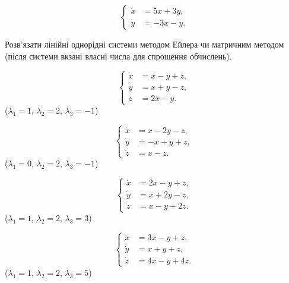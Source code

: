 \begin{multicols}{2}
    \begin{problem}
        \[ \left\{ \begin{aligned} 
            \dot x &= 5 x + 3 y, \\
            \dot y &= -3 x - y.
        \end{aligned} \right. \]
    \end{problem}
\end{multicols}

Розв'язати лінійні однорідні системи методом Ейлера чи матричним методом (після системи вкзані власні числа для спрощення обчислень).
\begin{multicols}{2}
    \begin{problem}
        \[ \left\{ \begin{aligned} 
            \dot x &= x - y + z, \\
            \dot y &= x + y - z, \\
            \dot z &= 2 x - y.
        \end{aligned} \right. \]
        ($\lambda_1 = 1$, $\lambda_2 = 2$, $\lambda_3 = -1$)
    \end{problem}
    
    \begin{problem}
        \[ \left\{ \begin{aligned} 
            \dot x &= x - 2 y - z, \\
            \dot y &= -x + y + z, \\
            \dot z &= x - z.
        \end{aligned} \right. \]
        ($\lambda_1 = 0$, $\lambda_2 = 2$, $\lambda_3 = -1$)
    \end{problem}
    
    \begin{problem}
        \[ \left\{ \begin{aligned} 
            \dot x &= 2 x - y + z, \\
            \dot y &= x + 2 y - z, \\
            \dot z &= x - y + 2 z.
        \end{aligned} \right. \]
        ($\lambda_1 = 1$, $\lambda_2 = 2$, $\lambda_3 = 3$)
    \end{problem}
    
    \begin{problem}
        \[ \left\{ \begin{aligned} 
            \dot x &= 3 x - y + z, \\
            \dot y &= x + y + z, \\
            \dot z &= 4 x - y + 4 z.
        \end{aligned} \right. \]
        ($\lambda_1 = 1$, $\lambda_2 = 2$, $\lambda_3 = 5$)
    \end{problem}
    

\end{multicols}
